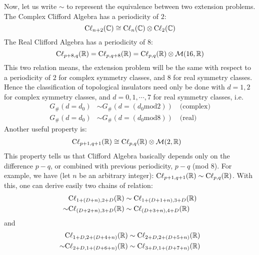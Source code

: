 \documentclass{article}
\begin{document}
Now, let us write $\sim$ to represent the equivalence between two extension
problems.  The Complex Clifford Algebra has a periodicity of $2$:
\begin{equation}
    \mathrm{C\ell}_{n+2}(\mathbb{C}) \cong \mathrm{C\ell}_{n}(\mathbb{C})\otimes
    \mathrm{C\ell}_{2}(\mathbb{C})
\end{equation}
The Real Clifford Algebra has a periodicity of $8$:
\begin{equation}
    \mathrm{C\ell}_{p+8,q}(\mathbb{R}) = \mathrm{C\ell}_{p,q+8}(\mathbb{R}) =
    \mathrm{C\ell}_{p,q}(\mathbb{R})\otimes\mathcal{M}(16,\mathbb{R})
\end{equation}
This two relation means, the extension problem will be the same with respect to
a periodicity of $2$ for complex symmetry classes, and $8$ for real symmetry
classes. Hence the classification of topological insulators need only be done
with $d=1,2$ for complex symmetry classes, and $d=0,1,\cdots,7$ for real
symmetry classes, i.e.
\begin{subequations}
    \label{eq:cli-periodic}
\begin{align}
    G_{\#}(d=d_0) &\sim G_{\#}(d=(d_0 \text{mod} 2)) \quad\text{(complex)} \\
    G_{\#}(d=d_0) &\sim G_{\#}(d=(d_0 \text{mod} 8)) \quad\text{(real)}
\end{align}
\end{subequations}
Another useful property is:
\begin{align}
    \mathrm{C\ell}_{p+1,q+1}(\mathbb{R}) &\cong
    \mathrm{C\ell}_{p,q}(\mathbb{R})\otimes\mathcal{M}(2,\mathbb{R})
\end{align}
This property tells us that Clifford Algebra basically depends only on the
difference $p-q$, or combined with previous periodicity, $p-q$ (mod $8$). For
example, we have (let $n$ be an arbitrary integer):
$\mathrm{C\ell}_{p+1,q+1}(\mathbb{R})\sim\mathrm{C\ell}_{p,q}(\mathbb{R})$. With this, one can
derive easily two chains of relation:
\begin{align}
    &\mathrm{C\ell}_{1+(D+n),2+D}(\mathbb{R}) \sim \mathrm{C\ell}_{1+(D+1+n),3+D}(\mathbb{R})
    \nonumber\\
    \sim & \mathrm{C\ell}_{(D+2+n),3+D}(\mathbb{R}) \sim \mathrm{C\ell}_{(D+3+n),4+D}(\mathbb{R})
\end{align}
and
\begin{align}
    &\mathrm{C\ell}_{1+D,2+(D+4+n)}(\mathbb{R})\sim \mathrm{C\ell}_{2+D,2+(D+5+n)}(\mathbb{R})
    \nonumber\\
    \sim& \mathrm{C\ell}_{2+D,1+(D+6+n)}(\mathbb{R}) \sim
    \mathrm{C\ell}_{3+D,1+(D+7+n)}(\mathbb{R})
\end{align}
\end{document}
